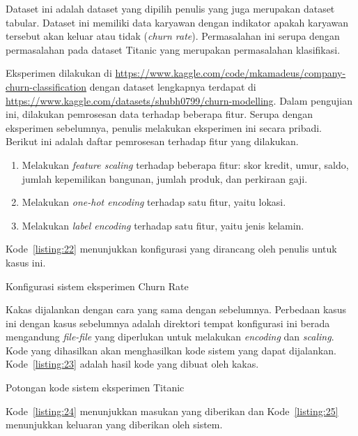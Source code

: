 Dataset ini adalah dataset yang dipilih penulis yang juga merupakan dataset tabular.
Dataset ini memiliki data karyawan dengan indikator apakah karyawan tersebut akan keluar atau tidak (\textit{churn rate}).
Permasalahan ini serupa dengan permasalahan pada dataset Titanic yang merupakan permasalahan klasifikasi.

Eksperimen dilakukan di \url{https://www.kaggle.com/code/mkamadeus/company-churn-classification} dengan dataset lengkapnya terdapat di \url{https://www.kaggle.com/datasets/shubh0799/churn-modelling}.
Dalam pengujian ini, dilakukan pemrosesan data terhadap beberapa fitur.
Serupa dengan eksperimen sebelumnya, penulis melakukan eksperimen ini secara pribadi.
Berikut ini adalah daftar pemrosesan terhadap fitur yang dilakukan.

\begin{enumerate}
	\item Melakukan \textit{feature scaling} terhadap beberapa fitur: skor kredit, umur, saldo, jumlah kepemilikan bangunan, jumlah produk, dan perkiraan gaji.
	\item Melakukan \textit{one-hot encoding} terhadap satu fitur, yaitu lokasi.
	\item Melakukan \textit{label encoding} terhadap satu fitur, yaitu jenis kelamin.
\end{enumerate}

Kode~\ref{listing:22} menunjukkan konfigurasi yang dirancang oleh penulis untuk kasus ini.

\begin{code}
	\caption{Konfigurasi sistem eksperimen Churn Rate}\label{listing:22}
\end{code}

Kakas dijalankan dengan cara yang sama dengan sebelumnya.
Perbedaan kasus ini dengan kasus sebelumnya adalah direktori tempat konfigurasi ini berada mengandung \textit{file-file} yang diperlukan untuk melakukan \textit{encoding} dan \textit{scaling}.
Kode yang dihasilkan akan menghasilkan kode sistem yang dapat dijalankan.
Kode~\ref{listing:23} adalah hasil kode yang dibuat oleh kakas.

\begin{code}
	\caption{Potongan kode sistem eksperimen Titanic}\label{listing:23}
\end{code}

Kode~\ref{listing:24} menunjukkan masukan yang diberikan dan Kode~\ref{listing:25} menunjukkan keluaran yang diberikan oleh sistem.

